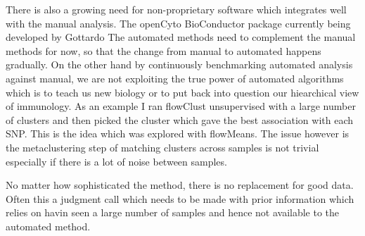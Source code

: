 There is also a growing need for non-proprietary software which integrates well with the manual analysis.
The openCyto BioConductor package currently being developed by Gottardo
The automated methods need to complement the manual methods for now, so that the change from manual to automated happens gradually.
On the other hand by continuously benchmarking automated analysis against manual,
we are not exploiting the true power of automated algorithms which is to teach us new biology or to put back into question our hiearchical view of immunology.
As an example I ran flowClust unsupervised with a large number of clusters and then picked the cluster which gave the best association with each SNP.
This is the idea which was explored with flowMeans.  The issue however is the metaclustering step of matching clusters across samples is not trivial especially if
there is a lot of noise between samples.



No matter how sophisticated the method, there is no replacement for good data.
Often this a judgment call which needs to be made with prior information which relies on havin seen a large number of samples and hence not available to the automated method.








